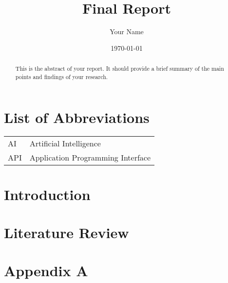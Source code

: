 \documentclass{report}
\begin{document}
\title{Final Report}
\author{Your Name}
\date{\today}
\maketitle

\begin{abstract}
This is the abstract of your report. It should provide a brief summary of the main points and findings of your research.
\end{abstract}

\tableofcontents

\listoffigures

\listoftables

\chapter*{List of Abbreviations}
\begin{tabular}{ll}
    AI & Artificial Intelligence \\
    API & Application Programming Interface \\
\end{tabular}

\chapter{Introduction}

\chapter{Literature Review}


\begin{thebibliography}{9}
\end{thebibliography}

\appendix
\chapter{Appendix A}
\end{document}
